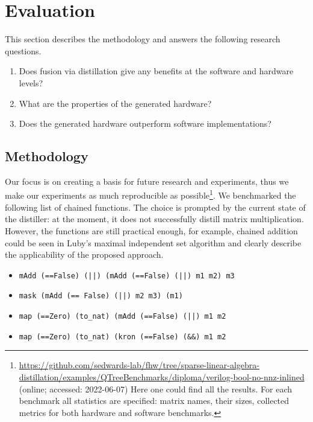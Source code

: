 \section{Evaluation}

This section describes the methodology and answers the following research questions.

\begin{enumerate}
    \item Does fusion via distillation give any benefits at the software and hardware levels?
    \item What are the properties of the generated hardware?
    \item Does the generated hardware outperform software implementations?
\end{enumerate}

\subsection{Methodology}

Our focus is on creating a basis for future research and experiments, thus we make our experiments as much reproducible as possible\footnote{\url{https://github.com/sedwards-lab/fhw/tree/sparse-linear-algebra-distillation/examples/QTreeBenchmarks/diploma/verilog-bool-no-nnz-inlined} (online; accessed:
2022-06-07) Here one could find all the results. For each benchmark all statistics are specified: matrix names, their sizes, collected metrics for both hardware and software benchmarks.}. We benchmarked the following list of chained functions. The choice is prompted by the current state of the distiller: at the moment, it does not successfully distill matrix multiplication. However, the functions are still practical enough, for example, chained addition could be seen in Luby's maximal independent set algorithm and clearly describe the applicability of the proposed approach.

\begin{itemize}
    \item \texttt{mAdd (==False) (||) (mAdd (==False) (||) m1 m2) m3}
    \item \texttt{mask (mAdd (== False) (||) m2 m3) (m1)}
    \item \texttt{map (==Zero) (to_nat) (mAdd (==False) (||) m1 m2}
    \item \texttt{map (==Zero) (to_nat) (kron (==False) (&&) m1 m2}
\end{itemize}

